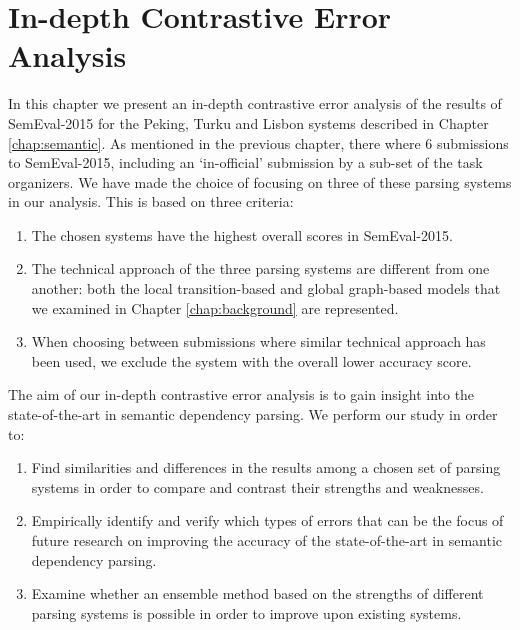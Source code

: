 \chapter{In-depth Contrastive Error Analysis}
\label{chap:analysis}




In this chapter we present an in-depth contrastive error analysis of the results of SemEval-2015 for the Peking, Turku and Lisbon systems described in Chapter \ref{chap:semantic}. As mentioned in the previous chapter, there where 6 submissions to SemEval-2015, including an `in-official' submission by a sub-set of the task organizers. We have made the choice of focusing on three of these parsing systems in our analysis. This is based on three criteria:

\begin{enumerate}
    \item The chosen systems have the highest overall scores in SemEval-2015.
    \item The technical approach of the three parsing systems are different from one another: both the local transition-based and global graph-based models that we examined in Chapter \ref{chap:background} are represented.
    \item When choosing between submissions where similar technical approach has been used, we exclude the system with the overall lower accuracy score.
\end{enumerate}

The aim of our in-depth contrastive error analysis is to gain insight into the state-of-the-art in semantic dependency parsing. We perform our study in order to:

\begin{enumerate}
    \item Find similarities and differences in the results among a chosen set of parsing systems in order to compare and contrast their strengths and weaknesses.
    \item Empirically identify and verify which types of errors that can be the focus of future research on improving the accuracy of the state-of-the-art in semantic dependency parsing.
    \item Examine whether an ensemble method based on the strengths of different parsing systems is possible in order to improve upon existing systems.
\end{enumerate}

